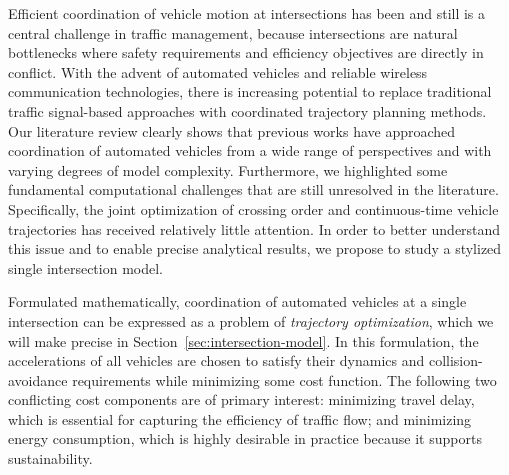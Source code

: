\documentclass[a4paper]{report}
\theoremstyle{definition}
\theoremstyle{plain}
\begin{document}




Efficient coordination of vehicle motion at intersections has been and still is
a central challenge in traffic management, because intersections are natural
bottlenecks where safety requirements and efficiency objectives are directly in
conflict.
%
With the advent of automated vehicles and reliable wireless communication
technologies, there is increasing potential to replace traditional traffic
signal-based approaches with coordinated trajectory planning methods.
%
Our literature review clearly shows that previous works have approached
coordination of automated vehicles from a wide range of perspectives and with
varying degrees of model complexity.
%
Furthermore, we highlighted some fundamental computational challenges that are
still unresolved in the literature.
%
Specifically, the joint optimization of crossing order and continuous-time
vehicle trajectories has received relatively little attention.
%
In order to better understand this issue and to enable precise analytical
results, we propose to study a stylized single intersection model.

Formulated mathematically, coordination of automated vehicles at a single
intersection can be expressed as a problem of \emph{trajectory optimization},
which we will make precise in Section~\ref{sec:intersection-model}.
%
In this formulation, the accelerations of all vehicles are chosen to satisfy
their dynamics and collision-avoidance requirements while minimizing some
cost function.
%
The following two conflicting cost components are of primary interest:
%
minimizing travel delay, which is essential for capturing the efficiency of
traffic flow; and minimizing energy consumption, which is highly desirable in
practice because it supports sustainability.
\end{document}
